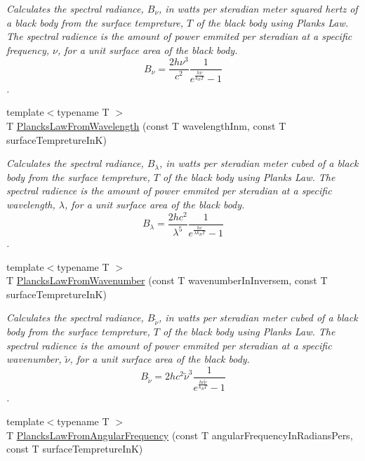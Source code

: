 \begin{DoxyCompactItemize}
\begin{DoxyCompactList}\small\item\em Calculates the spectral radiance, $B_{\nu}$, in watts per steradian meter squared hertz of a black body from the surface tempreture, $T$ of the black body using Plank\textquotesingle{}s Law. The spectral radience is the amount of power emmited per steradian at a specific frequency, $\nu$, for a unit surface area of the black body. \[ B_{\nu} = \dfrac{2 h \nu^3}{c^2} \dfrac{1}{e^{\frac{h\nu}{k_B T}} - 1} \]. \end{DoxyCompactList}\item 
{\footnotesize template$<$typename T $>$ }\\T \mbox{\hyperlink{group___e_g_x_phys-_electrodynamics-_black_body-_plancks_law_ga54639bc031ded51ef78aa82b0457a4dd}{Plancks\+Law\+From\+Wavelength}} (const T wavelength\+Inm, const T surface\+Tempreture\+InK)
\begin{DoxyCompactList}\small\item\em Calculates the spectral radiance, $B_{\lambda}$, in watts per steradian meter cubed of a black body from the surface tempreture, $T$ of the black body using Plank\textquotesingle{}s Law. The spectral radience is the amount of power emmited per steradian at a specific wavelength, $\lambda$, for a unit surface area of the black body. \[ B_{\lambda} = \dfrac{2 h c^2}{\lambda^5} \dfrac{1}{e^{\frac{hc}{\lambda k_B T}} - 1} \]. \end{DoxyCompactList}\item 
{\footnotesize template$<$typename T $>$ }\\T \mbox{\hyperlink{group___e_g_x_phys-_electrodynamics-_black_body-_plancks_law_ga6648ae2a0fbff6735c1e1a04c7cac746}{Plancks\+Law\+From\+Wavenumber}} (const T wavenumber\+In\+Inversem, const T surface\+Tempreture\+InK)
\begin{DoxyCompactList}\small\item\em Calculates the spectral radiance, $B_{\tilde {\nu }}$, in watts per steradian meter cubed of a black body from the surface tempreture, $T$ of the black body using Plank\textquotesingle{}s Law. The spectral radience is the amount of power emmited per steradian at a specific wavenumber, $\tilde {\nu }$, for a unit surface area of the black body. \[ B_{\tilde {\nu }} = 2 h c^2 \tilde {\nu }^3 \dfrac{1}{e^{\frac{hc \tilde {\nu }}{k_B T}} - 1} \]. \end{DoxyCompactList}\item 
{\footnotesize template$<$typename T $>$ }\\T \mbox{\hyperlink{group___e_g_x_phys-_electrodynamics-_black_body-_plancks_law_gaac540560c71e30c02b91d22e417b5863}{Plancks\+Law\+From\+Angular\+Frequency}} (const T angular\+Frequency\+In\+Radians\+Pers, const T surface\+Tempreture\+InK)

\end{DoxyCompactItemize}
